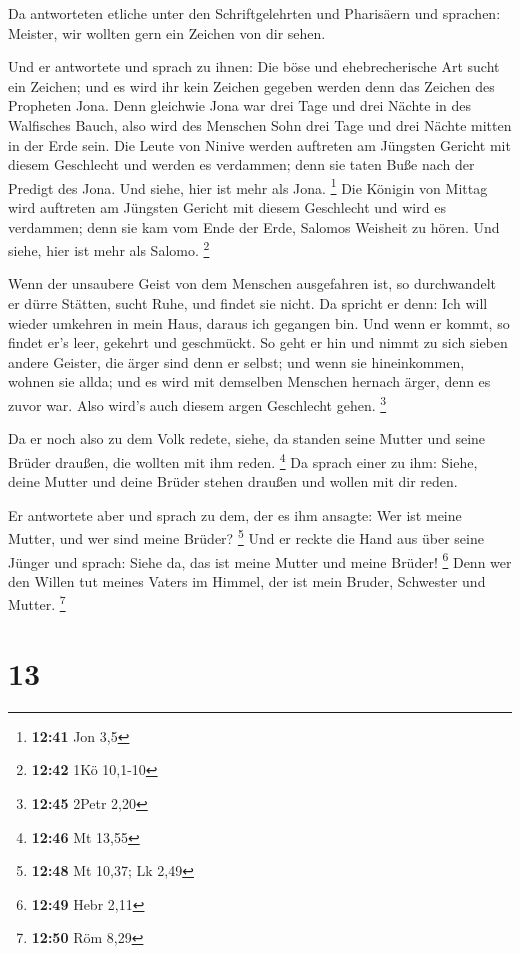  Da antworteten etliche unter den Schriftgelehrten und
Pharisäern und sprachen: Meister, wir wollten gern ein Zeichen von dir
sehen.

 Und er antwortete und sprach zu ihnen: Die böse und
ehebrecherische Art sucht ein Zeichen; und es wird ihr kein Zeichen
gegeben werden denn das Zeichen des Propheten Jona.  Denn
gleichwie Jona war drei Tage und drei Nächte in des Walfisches Bauch,
also wird des Menschen Sohn drei Tage und drei Nächte mitten in der Erde
sein.  Die Leute von Ninive werden auftreten am Jüngsten
Gericht mit diesem Geschlecht und werden es verdammen; denn sie taten
Buße nach der Predigt des Jona. Und siehe, hier ist mehr als Jona.
\footnote{\textbf{12:41} Jon 3,5}  Die Königin von Mittag
wird auftreten am Jüngsten Gericht mit diesem Geschlecht und wird es
verdammen; denn sie kam vom Ende der Erde, Salomos Weisheit zu hören.
Und siehe, hier ist mehr als Salomo. \footnote{\textbf{12:42} 1Kö
  10,1-10}

 Wenn der unsaubere Geist von dem Menschen ausgefahren
ist, so durchwandelt er dürre Stätten, sucht Ruhe, und findet sie nicht.
 Da spricht er denn: Ich will wieder umkehren in mein
Haus, daraus ich gegangen bin. Und wenn er kommt, so findet er's leer,
gekehrt und geschmückt.  So geht er hin und nimmt zu sich
sieben andere Geister, die ärger sind denn er selbst; und wenn sie
hineinkommen, wohnen sie allda; und es wird mit demselben Menschen
hernach ärger, denn es zuvor war. Also wird's auch diesem argen
Geschlecht gehen. \footnote{\textbf{12:45} 2Petr 2,20}

 Da er noch also zu dem Volk redete, siehe, da standen
seine Mutter und seine Brüder draußen, die wollten mit ihm reden.
\footnote{\textbf{12:46} Mt 13,55}  Da sprach einer zu
ihm: Siehe, deine Mutter und deine Brüder stehen draußen und wollen mit
dir reden.

 Er antwortete aber und sprach zu dem, der es ihm
ansagte: Wer ist meine Mutter, und wer sind meine Brüder? \footnote{\textbf{12:48}
  Mt 10,37; Lk 2,49}  Und er reckte die Hand aus über
seine Jünger und sprach: Siehe da, das ist meine Mutter und meine
Brüder! \footnote{\textbf{12:49} Hebr 2,11}  Denn wer den
Willen tut meines Vaters im Himmel, der ist mein Bruder, Schwester und
Mutter. \footnote{\textbf{12:50} Röm 8,29}

\hypertarget{section-9}{%
\section{13}\label{section-9}}

